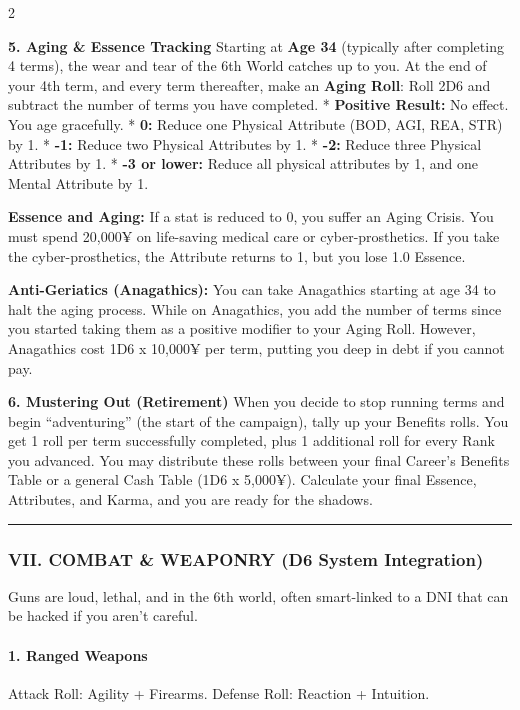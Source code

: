 \documentclass[
  oneside]{article}
\begin{document}
\begin{multicols}{2}

\textbf{5. Aging \& Essence Tracking} Starting at
\textbf{Age 34} (typically after completing 4
terms), the wear and tear of the 6th World catches
up to you. At the end of your 4th term, and every
term thereafter, make an \textbf{Aging Roll}: Roll
2D6 and subtract the number of terms you have
completed. * \textbf{Positive Result:} No effect.
You age gracefully. * \textbf{0:} Reduce one
Physical Attribute (BOD, AGI, REA, STR) by 1. *
\textbf{-1:} Reduce two Physical Attributes by 1.
* \textbf{-2:} Reduce three Physical Attributes by
1. * \textbf{-3 or lower:} Reduce all physical
attributes by 1, and one Mental Attribute by 1.

\textbf{Essence and Aging:} If a stat is reduced
to 0, you suffer an Aging Crisis. You must spend
20,000¥ on life-saving medical care or
cyber-prosthetics. If you take the
cyber-prosthetics, the Attribute returns to 1, but
you lose 1.0 Essence.

\textbf{Anti-Geriatics (Anagathics):} You can take
Anagathics starting at age 34 to halt the aging
process. While on Anagathics, you add the number
of terms since you started taking them as a
positive modifier to your Aging Roll. However,
Anagathics cost 1D6 x 10,000¥ per term, putting
you deep in debt if you cannot pay.

\textbf{6. Mustering Out (Retirement)} When you
decide to stop running terms and begin
``adventuring'' (the start of the campaign), tally
up your Benefits rolls. You get 1 roll per term
successfully completed, plus 1 additional roll for
every Rank you advanced. You may distribute these
rolls between your final Career's Benefits Table
or a general Cash Table (1D6 x 5,000¥). Calculate
your final Essence, Attributes, and Karma, and you
are ready for the shadows.

\begin{center}\rule{0.5\linewidth}{0.5pt}\end{center}

\hypertarget{vii.-combat-weaponry-d6-system-integration}{%
\subsubsection{VII. COMBAT \& WEAPONRY (D6 System
Integration)}\label{vii.-combat-weaponry-d6-system-integration}}

Guns are loud, lethal, and in the 6th world, often
smart-linked to a DNI that can be hacked if you
aren't careful.

\hypertarget{ranged-weapons}{%
\paragraph{1. Ranged
Weapons}\label{ranged-weapons}}

Attack Roll: Agility + Firearms. Defense Roll:
Reaction + Intuition.

\end{multicols}
\end{document}
